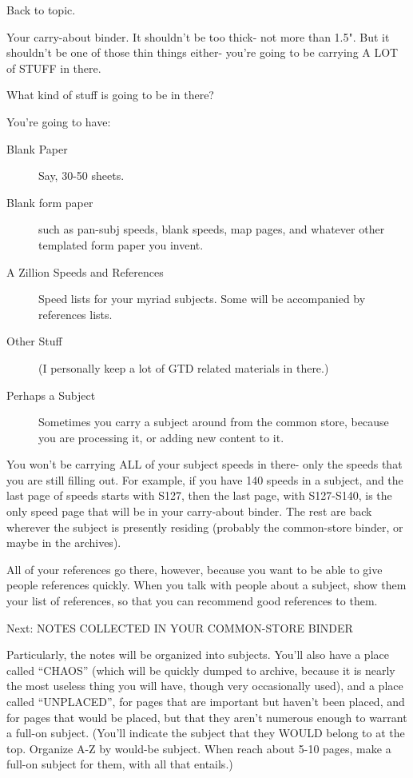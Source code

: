 \documentclass[oneside]{book}
\begin{document}
Back to topic.

Your carry-about binder. It shouldn't be too thick- not more than
1.5". But it shouldn't be one of those thin things either- you're
going to be carrying A LOT of STUFF in there.

What kind of stuff is going to be in there?

You're going to have:
\begin{description}
\item[Blank Paper] Say, 30-50 sheets.
\item[Blank form paper] such as pan-subj speeds, blank speeds, map pages,
and whatever other templated form paper you invent.
\item[A Zillion Speeds and References] Speed lists for your myriad
subjects. Some will be accompanied by references lists.
\item[Other Stuff] (I personally keep a lot of GTD related materials in
there.)
\item[Perhaps a Subject] Sometimes you carry a subject around from the
common store, because you are processing it, or adding new content to it.
\end{description}

You won't be carrying ALL of your subject speeds in there- only the
speeds that you are still filling out. For example, if you have 140
speeds in a subject, and the last page of speeds starts with S127,
then the last page, with S127-S140, is the only speed page that will
be in your carry-about binder. The rest are back wherever the subject
is presently residing (probably the common-store binder, or maybe in
the archives).

All of your references go there, however, because you want to be able
to give people references quickly. When you talk with people about a
subject, show them your list of references, so that you can recommend
good references to them.

Next: NOTES COLLECTED IN YOUR COMMON-STORE BINDER

Particularly, the notes will be organized into subjects. You'll also
have a place called ``CHAOS'' (which will be quickly dumped to archive,
because it is nearly the most useless thing you will have, though very
occasionally used), and a place called ``UNPLACED'', for pages that are
important but haven't been placed, and for pages that would be placed,
but that they aren't numerous enough to warrant a full-on
subject. (You'll indicate the subject that they WOULD belong to at the
top. Organize A-Z by would-be subject. When reach about 5-10 pages,
make a full-on subject for them, with all that entails.)
\end{document}
